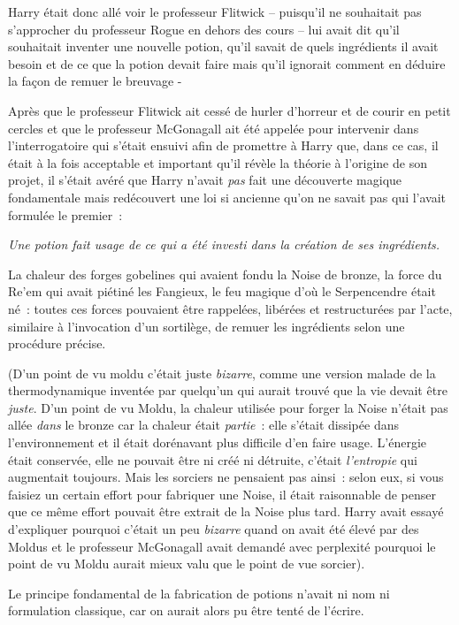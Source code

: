 Harry était donc allé voir le professeur Flitwick -- puisqu'il ne souhaitait pas s'approcher du professeur Rogue en dehors des cours -- lui avait dit qu'il souhaitait inventer une nouvelle potion, qu'il savait de quels ingrédients il avait besoin et de ce que la potion devait faire mais qu'il ignorait comment en déduire la façon de remuer le breuvage -

Après que le professeur Flitwick ait cessé de hurler d'horreur et de courir en petit cercles et que le professeur McGonagall ait été appelée pour intervenir dans l'interrogatoire qui s'était ensuivi afin de promettre à Harry que, dans ce cas, il était à la fois acceptable et important qu'il révèle la théorie à l'origine de son projet, il s'était avéré que Harry n'avait \emph{pas} fait une découverte magique fondamentale mais redécouvert une loi si ancienne qu'on ne savait pas qui l'avait formulée le premier~:

\emph{Une potion fait usage de ce qui a été investi dans la création de ses ingrédients.}

La chaleur des forges gobelines qui avaient fondu la Noise de bronze, la force du Re'em qui avait piétiné les Fangieux, le feu magique d'où le Serpencendre était né~: toutes ces forces pouvaient être rappelées, libérées et restructurées par l'acte, similaire à l'invocation d'un sortilège, de remuer les ingrédients selon une procédure précise.

(D'un point de vu moldu c'était juste \emph{bizarre}, comme une version malade de la thermodynamique inventée par quelqu'un qui aurait trouvé que la vie devait être \emph{juste}. D'un point de vu Moldu, la chaleur utilisée pour forger la Noise n'était pas allée \emph{dans} le bronze car la chaleur était \emph{partie}~: elle s'était dissipée dans l'environnement et il était dorénavant plus difficile d'en faire usage. L'énergie était conservée, elle ne pouvait être ni créé ni détruite, c'était \emph{l'entropie} qui augmentait toujours. Mais les sorciers ne pensaient pas ainsi~: selon eux, si vous faisiez un certain effort pour fabriquer une Noise, il était raisonnable de penser que ce même effort pouvait être extrait de la Noise plus tard. Harry avait essayé d'expliquer pourquoi c'était un peu \emph{bizarre} quand on avait été élevé par des Moldus et le professeur McGonagall avait demandé avec perplexité pourquoi le point de vu Moldu aurait mieux valu que le point de vue sorcier).

Le principe fondamental de la fabrication de potions n'avait ni nom ni formulation classique, car on aurait alors pu être tenté de l'écrire.

